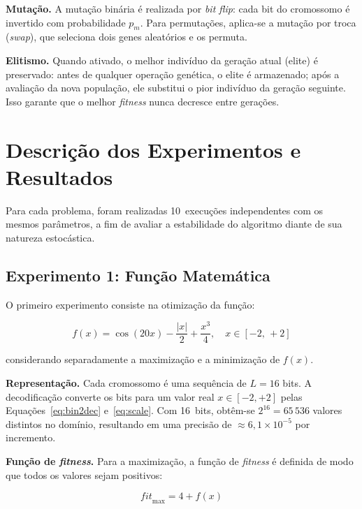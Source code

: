 \documentclass[12pt,twocolumn]{article}
\begin{document}
\textbf{Mutação.} A mutação binária é realizada por \textit{bit flip}: cada bit do
cromossomo é invertido com probabilidade $p_m$. Para permutações, aplica-se a mutação por
troca (\textit{swap}), que seleciona dois genes aleatórios e os permuta.

\textbf{Elitismo.} Quando ativado, o melhor indivíduo da geração atual (elite) é
preservado: antes de qualquer operação genética, o elite é armazenado; após a avaliação
da nova população, ele substitui o pior indivíduo da geração seguinte. Isso garante que o
melhor \textit{fitness} nunca decresce entre gerações.

\section{Descrição dos Experimentos e Resultados}

Para cada problema, foram realizadas 10~execuções independentes com os mesmos parâmetros,
a fim de avaliar a estabilidade do algoritmo diante de sua natureza estocástica.

\subsection{Experimento 1: Função Matemática}

O primeiro experimento consiste na otimização da função:

\begin{equation}
  f(x) = \cos(20x) - \frac{|x|}{2} + \frac{x^3}{4},
  \quad x \in [-2,\, +2]
  \label{eq:fx}
\end{equation}

\noindent considerando separadamente a maximização e a minimização de $f(x)$.

\textbf{Representação.} Cada cromossomo é uma sequência de $L = 16$ bits. A decodificação
converte os bits para um valor real $x \in [-2, +2]$ pelas Equações~\ref{eq:bin2dec}
e~\ref{eq:scale}. Com 16~bits, obtêm-se $2^{16} = 65\,536$ valores distintos no domínio,
resultando em uma precisão de $\approx 6{,}1 \times 10^{-5}$ por incremento.

\textbf{Função de \textit{fitness}.} Para a maximização, a função de \textit{fitness} é
definida de modo que todos os valores sejam positivos:

\begin{equation}
  \mathit{fit}_{\max} = 4 + f(x)
  \label{eq:fitmax}
\end{equation}
\end{document}
